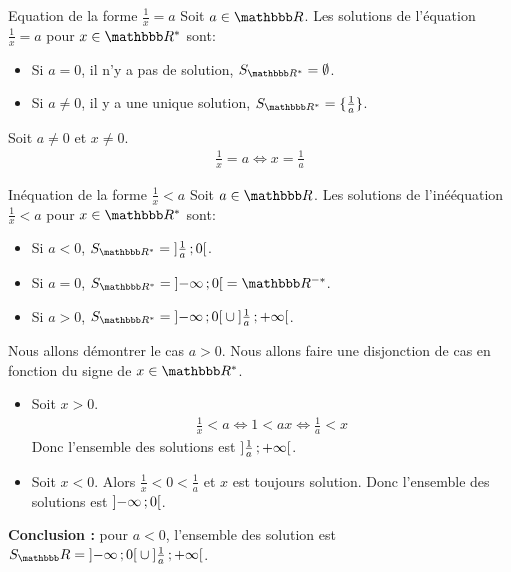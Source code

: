 \documentclass[10pt,a4paper,openany,twoside]{book}
\begin{document}
	\begin{prop}{Equation de la forme $\frac{1}{x}=a$}{}
		Soit $a\in\R$. Les solutions de l'équation $\frac{1}{x}=a$ pour $x\in\R^*$ sont:
		\begin{itemize}
			\item Si $a = 0$, il n'y a pas de solution, $S_{\R^*} = \emptyset$.
			\item Si $a \ne 0$, il y a une unique solution, $S_{\R^*} = \{ \frac{1}{a} \}$.
		\end{itemize}
	\end{prop}

	\begin{ex}{}{}
		Soit $a \ne 0$ et $x \ne 0$.
		\begin{align*}
			\frac{1}{x} = a \iff x = \frac{1}{a}
		\end{align*}
	\end{ex}

	\begin{prop}{Inéquation de la forme $\frac{1}{x}<a$}{}
		Soit $a\in\R$. Les solutions de l'inééquation $\frac{1}{x}<a$ pour $x\in\R^*$ sont:
		\begin{itemize}
			\item Si $a < 0$, $S_{\R^*} = \oo{\frac{1}{a}}{0}$.
			\item Si $a = 0$, $S_{\R^*} = \oo{-\infty}{0} = \R^{-*}$.
			\item Si $a > 0$, $S_{\R^*} = \oo{-\infty}{0} \cup \oo{\frac{1}{a}}{+\infty}$.
		\end{itemize}
	\end{prop}

	\begin{dem}{}{}
		Nous allons démontrer le cas $a>0$. Nous allons faire une disjonction de cas en fonction du signe de $x\in\R^*$.

		\begin{itemize}
			\item Soit $x>0$.
			\begin{align*}
				\frac{1}{x} < a \iff 1 < ax \iff \frac{1}{a} < x
			\end{align*}
			Donc l'ensemble des solutions est $\mathopen{]}\frac{1}{a}\mathclose{}\mathpunct{};+\infty\mathclose{[}$.

			\item Soit $x<0$. Alors $\frac{1}{x}<0<\frac{1}{a}$ et $x$ est toujours solution.
			Donc l'ensemble des solutions est $\mathopen{]}-\infty\mathclose{}\mathpunct{};0\mathclose{[}$.
		\end{itemize}

		\textbf{Conclusion :} pour $a<0$, l'ensemble des solution est $S_\R = \oo{-\infty}{0} \cup \oo{\frac{1}{a}}{+\infty}$.
	\end{dem}
\end{document}

